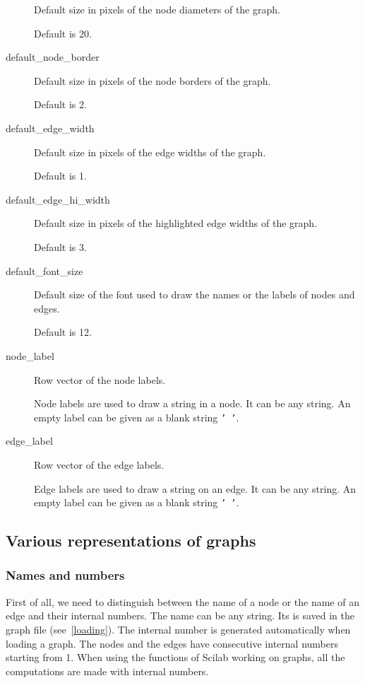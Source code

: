 \documentclass[11pt]{article}
\begin{document}
\begin{description}
Default size in pixels of the node diameters of the graph.

Default is 20.

  \item[default\_node\_border]

Default size in pixels of the node borders of the graph.

Default is 2.

  \item[default\_edge\_width]

Default size in pixels of the edge widths of the graph.

Default is 1.

  \item[default\_edge\_hi\_width]

Default size in pixels of the highlighted edge widths of the graph.

Default is 3.

  \item[default\_font\_size]

Default size of the font used to draw the names or the labels of nodes
and edges.

Default is 12.

  \item[node\_label]

Row vector of the node labels.

Node labels are used to draw a string in a node. It can be any string.
An empty label can be given as a blank string \texttt{' '}.

  \item[edge\_label]

Row vector of the edge labels.

Edge labels are used to draw a string on an edge. It can be any string.
An empty label can be given as a blank string \texttt{' '}.

\end{description}

\subsection{Various representations of graphs}\label{representation}

\subsubsection{Names and numbers}\label{number}

First of all, we need to distinguish between the name of a node or the
name of an
edge and their internal numbers. The name can be any string. Its is saved
in the graph file (see~\ref{loading}).
The internal
number is generated automatically when loading a graph. The nodes and
the edges have 
consecutive internal numbers starting from 1. 
When using the functions of Scilab working on graphs, all the
computations are made with internal numbers.
\end{document}
